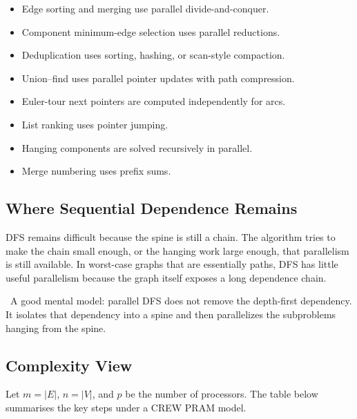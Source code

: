 \begin{itemize}
    \item Edge sorting and merging use parallel divide-and-conquer.
    \item Component minimum-edge selection uses parallel reductions.
    \item Deduplication uses sorting, hashing, or scan-style compaction.
    \item Union--find uses parallel pointer updates with path compression.
    \item Euler-tour next pointers are computed independently for arcs.
    \item List ranking uses pointer jumping.
    \item Hanging components are solved recursively in parallel.
    \item Merge numbering uses prefix sums.
\end{itemize}

\subsection{Where Sequential Dependence Remains}

DFS remains difficult because the spine is still a chain.
The algorithm tries to make the chain small enough, or the hanging work large enough, that parallelism is still available.
In worst-case graphs that are essentially paths, DFS has little useful parallelism because the graph itself exposes a long dependence chain.

\begin{ppnote}
\ A good mental model: parallel DFS does not remove the depth-first dependency.
It isolates that dependency into a spine and then parallelizes the subproblems hanging from the spine.
\end{ppnote}

\subsection{Complexity View}

Let \(m = |E|\), \(n = |V|\), and \(p\) be the number of processors.
The table below summarises the key steps under a CREW PRAM model.

